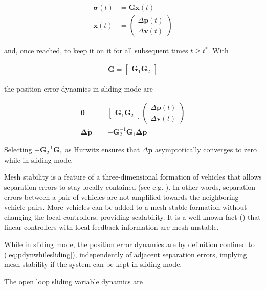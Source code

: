 \documentclass{ifacconf}
\providecommand{\mbf}[1]{\mathbf{#1}}
\begin{document}
\begin{align}
\mbf{\sigma}(t) &= \mbf{G}\mbf{x}(t)
\label{eq:defsigmaconti-} \\
\mbf{x}(t) &=
\begin{pmatrix}
\Delta \mbf{p}(t)\\
\Delta \mbf{v}(t)
\end{pmatrix}
\end{align}

and, once reached, to keep it on it for all subsequent times $t \geq t^*$. With

\begin{align}
\mbf{G} =
\begin{bmatrix}
\mbf{G}_1 \mbf{G}_2
\end{bmatrix}
\end{align}

the position error dynamics in sliding mode are

\begin{align}
\mbf{0}
&=
\begin{bmatrix}
\mbf{G}_1 \mbf{G}_2
\end{bmatrix}
\begin{pmatrix}
\Delta \mbf{p}(t)\\
\Delta \mbf{v}(t)
\end{pmatrix} \\
\mbf{\Delta} \dot{\mbf{p}}
&= - \mbf{G}_2^{-1} \mbf{G}_1 \mbf{\Delta} \mbf{p}
\label{eq:pdynwhilesliding}
\end{align}

Selecting $- \mbf{G}_2^{-1} \mbf{G}_1$ as Hurwitz ensures that $\Delta \mbf{p}$ asymptotically converges to zero while in sliding mode.

Mesh stability is a feature of a three-dimensional formation of vehicles that allows separation errors to stay locally contained (see e.g. \cite{Pant2002}). In other words, separation errors between a pair of vehicles are not amplified towards the neighboring vehicle pairs. More vehicles can be added to a mesh stable formation without changing the local controllers, providing scalability. It is a well known fact (\cite{Pant2002}) that linear controllers with local feedback information are mesh unstable.

While in sliding mode, the position error dynamics are by definition confined to (\ref{eq:pdynwhilesliding}), independently of adjacent separation errors, implying mesh stability if the system can be kept in sliding mode.

The open loop sliding variable dynamics are
\end{document}
